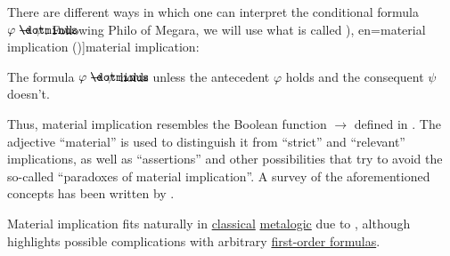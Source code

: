 \begin{remark}\label{rem:material_implication}
  There are different ways in which one can interpret the conditional formula \( \varphi \synimplies \psi \). Following Philo of Megara, we will use what is called \term[ru=материальная импликация (\cite[74]{КолмогоровДрагалин2006}), en=material implication (\cite[6]{VanDalen2004})]{material implication}:
  \begin{displayquote}
    The formula \( \varphi \synimplies \psi \) holds unless the antecedent \( \varphi \) holds and the consequent \( \psi \) doesn't.
  \end{displayquote}

  Thus, material implication resembles the Boolean function \( {\rightarrow} \) defined in . The adjective \enquote{material} is used to distinguish it from \enquote{strict} and \enquote{relevant} implications, as well as \enquote{assertions} and other possibilities that try to avoid the so-called \enquote{paradoxes of material implication}. A survey of the aforementioned concepts has been written by .

  Material implication fits naturally in \hyperref[rem:classical_logic]{classical} \hyperref[rem:metalogic]{metalogic} due to , although  highlights possible complications with arbitrary \hyperref[def:first_order_syntax/formula]{first-order formulas}.
\end{remark}

